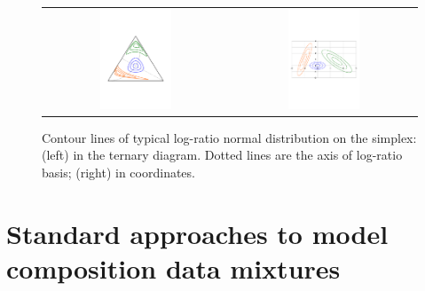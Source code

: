 \documentclass[preprint, review, 3p, authoryear]{elsarticle}
\begin{document}
\begin{figure}[thbp]
\begin{center}
\begin{tabular}{cc}
  \includegraphics[trim=0cm 6cm 0cm 4cm,width=0.4\textwidth]{fig01_elipsesS3Axes.pdf} &\includegraphics[trim=0cm 6cm 0cm 4cm,width=0.4\textwidth]{fig01_elipsesS3AxesC.pdf} \\
 \end{tabular}
 \caption{Contour lines of typical log-ratio normal distribution on the simplex: (left) in the ternary diagram. Dotted lines are the axis of log-ratio basis; (right) in coordinates. }\label{fig01}
\end{center}
\end{figure}



\section{Standard approaches to model composition data mixtures}
\label{standard_section}
\end{document}

